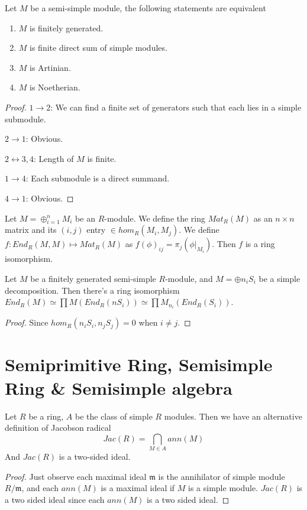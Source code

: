 \documentclass[12pt]{book}
\begin{document}
	\begin{theorem}
		Let $M$ be a semi-simple module, the following statements are equivalent
		\begin{enumerate}
			\item $M$ is finitely generated.
			\item $M$ is finite direct sum of simple modules.
			\item $M$ is Artinian.
			\item $M$ is Noetherian.
		\end{enumerate}
	\end{theorem}
	
	\begin{proof}
		$1\rightarrow 2$: We can find a finite set of generators such that each lies in a simple submodule.
		
		$2\rightarrow 1$: Obvious.
		
		$2\leftrightarrow 3,4$: Length of $M$ is finite.
		
		$1\rightarrow 4$: Each submodule is a direct summand.
		
		$4\rightarrow 1$: Obvious.
	\end{proof}
	
	\begin{theorem}
		Let $M=\oplus_{i=1}^n M_i$ be an $R$-module. We define the ring $Mat_R(M)$ as an $n\times n$ matrix and its $(i,j)$ entry $\in hom_R(M_i,M_j)$. We define $f:End_R(M,M)\mapsto Mat_R(M)$ as $f(\phi)_{ij}=\pi_j(\phi|_{M_i})$. Then $f$ is a ring isomorphism.
	\end{theorem}
	
	
	\begin{corollary}
		Let $M$ be a finitely generated semi-simple $R$-module, and $M=\oplus n_iS_i$ be a simple decomposition. Then there's a ring isomorphism $End_R(M)\simeq\prod M(End_R(nS_i))\simeq\prod M_{n_i}(End_R(S_i))$.
	\end{corollary}
	\begin{proof}
		Since $hom_R(n_iS_i,n_jS_j)=0$ when $i\neq j$.
	\end{proof}
	
	\section{Semiprimitive Ring,  Semisimple Ring \& Semisimple algebra}
	
	\begin{theorem}
		Let $R$ be a ring, $A$ be the class of simple $R$ modules. Then we have an alternative definition of Jacobson radical
		\begin{equation}
			Jac(R)=\bigcap_{M\in A}ann(M)
		\end{equation}
		And $Jac(R)$ is a two-sided ideal.
	\end{theorem}
	\begin{proof}
		Just observe each maximal ideal $\mathfrak m$ is the annihilator of simple module $R/\mathfrak m$, and each $ann (M)$ is a maximal ideal if $M$ is a simple module. $Jac(R)$ is a two sided ideal since each $ann(M)$ is a two sided ideal.
	\end{proof}
	
\end{document}
